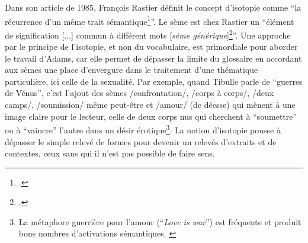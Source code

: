 Dans son article de 1985, François Rastier définit le concept d'isotopie comme \enquote{la récurrence d'un même trait sémantique\footcite{rastier_isotopie_1985}}. Le sème est chez Rastier un \enquote{élément de signification {[...]} commun à différent mots {[}\textit{sème générique}{]}\footcite{pincemin1999semantique}}. Une approche par le principe de l'isotopie, et non du vocabulaire, est primordiale pour aborder le travail d'Adams, car elle permet de dépasser la limite du glossaire en accordant aux sèmes une place d'envergure dans le traitement d'une thématique particulière, ici celle de la sexualité. Par exemple, quand Tibulle parle de \enquote{guerres de Vénus}, c'est l'ajout des sèmes /confrontation/, /corps à corps/, /deux camps/, /soumission/ même peut-être et /amour/ (de déesse) qui mènent à une image claire pour le lecteur, celle de deux corps nus qui cherchent à \enquote{soumettre} ou à \enquote{vaincre} l'autre dans un désir érotique\footnote{La métaphore guerrière pour l'amour (\enquote{\textit{Love is war}}) est fréquente et produit bons nombres d'activations sémantiques. \textcite{lakoff_metaphors_2003}}. La notion d'isotopie pousse à dépasser le simple relevé de formes pour devenir un relevés d'extraits et de contextes, ceux sans qui il n'est pas possible de faire sens.

